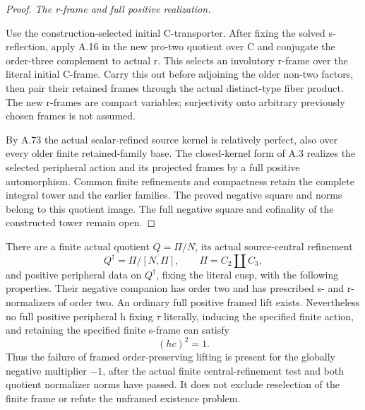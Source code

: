 \begin{proof}
\emph{The r-frame and full positive realization.}\par
Use the construction-selected initial C-transporter. After fixing
the solved s-reflection, apply A.16 in the new pro-two quotient
over C and conjugate the order-three complement to actual r.
This selects an involutory r-frame over the literal initial C-frame.
Carry this out before adjoining the older non-two factors, then
pair their retained frames through the actual distinct-type fiber
product. The new r-frames are compact variables; surjectivity onto
arbitrary previously chosen frames is not assumed.

By A.73 the actual scalar-refined source kernel is relatively
perfect, also over every older finite retained-family base.
The closed-kernel form of A.3 realizes the selected peripheral
action and its projected frames by a full positive automorphism.
Common finite refinements and compactness retain the complete
integral tower and the earlier families. The proved negative
square and norms belong to this quotient image. The full negative
square and cofinality of the constructed tower remain open.
\end{proof}


There are a finite actual quotient \(Q=\Pi/N\), its actual
source-central refinement
\[
 Q^\dagger=\Pi/\overline{[N,\Pi]},
 \qquad \Pi=C_2\amalg C_3,
 \tag{A.76.1}
\]
and positive peripheral data on \(Q^\dagger\), fixing the literal
cusp, with the following properties. Their negative companion has
order two and has prescribed s- and r-normalizers of order two.
An ordinary full positive framed lift exists. Nevertheless no full
positive peripheral h fixing \(\tau\) literally, inducing the
specified finite action, and retaining the specified finite s-frame
can satisfy
\[
                         (hc)^2=1.
 \tag{A.76.2}
\]
Thus the failure of framed order-preserving lifting is present for
the globally negative multiplier \(-1\), after the actual finite
central-refinement test and both quotient normalizer norms have
passed. It does not exclude reselection of the finite frame or
refute the unframed existence problem.

